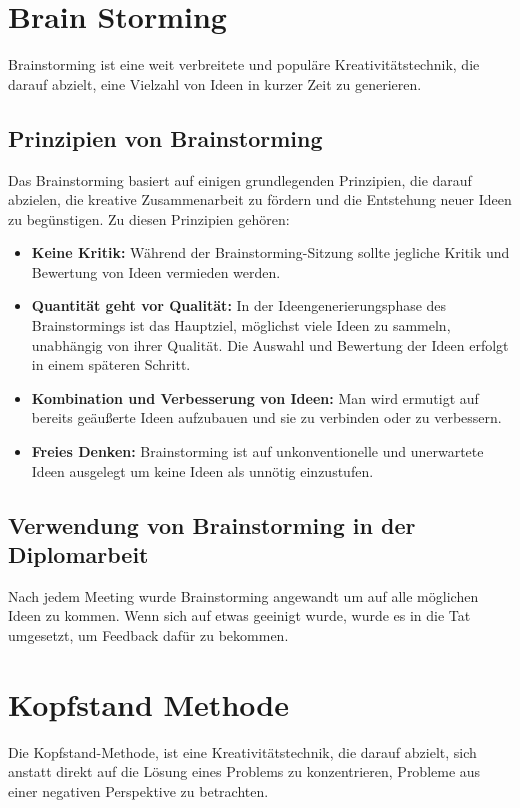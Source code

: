     \section{Brain Storming}

    Brainstorming ist eine weit verbreitete und populäre Kreativitätstechnik, die darauf abzielt, eine Vielzahl von Ideen in kurzer Zeit zu generieren.

    \subsection{Prinzipien von Brainstorming}
    Das Brainstorming basiert auf einigen grundlegenden Prinzipien, die darauf abzielen, die kreative Zusammenarbeit zu fördern und die Entstehung neuer Ideen zu begünstigen. Zu diesen Prinzipien gehören:

    \begin{itemize}
        \item \textbf{Keine Kritik:} Während der Brainstorming-Sitzung sollte jegliche Kritik und Bewertung von Ideen vermieden werden.
        \item \textbf{Quantität geht vor Qualität:} In der Ideengenerierungsphase des Brainstormings ist das Hauptziel, möglichst viele Ideen zu sammeln, unabhängig von ihrer Qualität. Die Auswahl und Bewertung der Ideen erfolgt in einem späteren Schritt.
        \item \textbf{Kombination und Verbesserung von Ideen:} Man wird ermutigt auf bereits geäußerte Ideen aufzubauen und sie zu verbinden oder zu verbessern.
        \item \textbf{Freies Denken:} Brainstorming ist auf unkonventionelle und unerwartete Ideen ausgelegt um keine Ideen als unnötig einzustufen.
    \end{itemize}

    \subsection{Verwendung von Brainstorming in der Diplomarbeit}
    Nach jedem Meeting wurde Brainstorming angewandt um auf alle möglichen Ideen zu kommen. Wenn sich auf etwas geeinigt wurde, wurde es in die Tat umgesetzt, um Feedback dafür zu bekommen.

 \pagebreak

    \section{Kopfstand Methode}
    Die Kopfstand-Methode, ist eine Kreativitätstechnik, die darauf abzielt, sich anstatt direkt auf die Lösung eines Problems zu konzentrieren,  Probleme aus einer negativen Perspektive zu betrachten.

